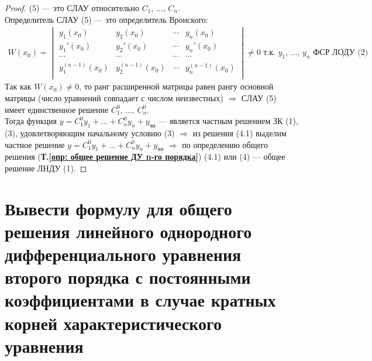 \begin{proof}
    (5) --- это СЛАУ относительно $C_1,\, \ldots,\, C_n$.\\[1ex]
    Определитель СЛАУ (5) --- это определитель Вронского:
    \begin{gather*}
        W (x_0) = \begin{vmatrix}
            y_1(x_0) & y_2(x_0) & \cdots & y_n(x_0) \\
            y_1'(x_0) & y_2'(x_0) & \cdots & y_n'(x_0) \\
            \cdots & \cdots & \cdots & \cdots \\
            y_1^{(n-1)}(x_0) & y_2^{(n-1)}(x_0) & \cdots & y_n^{(n-1)}(x_0)\\
        \end{vmatrix} \ne 0\text{ т.к. } y_1,\, \ldots,\, y_n \text{ ФСР ЛОДУ (2)}
    \end{gather*}
    Так как $W(x_0) \ne 0$, то ранг расширенной матрицы равен рангу основной матрицы (число уравнений совпадает с числом неизвестных) $\Rightarrow$ СЛАУ (5) имеет единственное решение $C_1^0,\, \ldots,\, C_n^0$. \\[1ex]
    Тогда функция $y = C_1^0 y_1 + \ldots + C_n^0y_n + y_{\text{чн}}$ --- является частным решением ЗК (1), (3), удовлетворяющим начальному условию (3) $\Rightarrow$ из решения (4.1) выделим частное решение $y = C_1^0 y_1 + \ldots + C_n^0y_n + y_{\text{чн}}$ $\Rightarrow$ по определению общего решения (\textbf{Т.\ref{опр: общее решение ДУ n-го порядка}}) (4.1) или (4) --- общее решение ЛНДУ (1).
\end{proof}

\newpage
\section{Вывести формулу для общего решения линейного однородного дифференциального уравнения второго порядка с постоянными коэффициентами в случае кратных корней характеристического уравнения}

